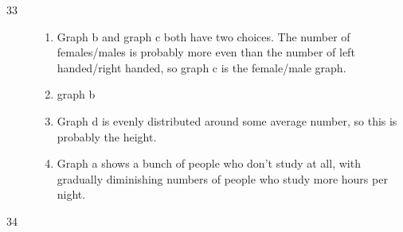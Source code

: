 \documentclass{exam}
\begin{document}
\begin{description}
      \item[33]
        \begin{enumerate}
          \item Graph b and graph c both have two choices.  The number of females/males is probably more even than the
            number of left handed/right handed, so graph c is the female/male graph.

          \item graph b

          \item Graph d is evenly distributed around some average number, so this is probably the height.

          \item Graph a shows a bunch of people who don't study at all, with gradually diminishing numbers of people who
            study more hours per night.
        \end{enumerate}

      \item[34]
\end{description}
\end{document}
